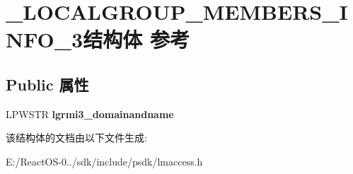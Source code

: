 \hypertarget{struct___l_o_c_a_l_g_r_o_u_p___m_e_m_b_e_r_s___i_n_f_o__3}{}\section{\+\_\+\+L\+O\+C\+A\+L\+G\+R\+O\+U\+P\+\_\+\+M\+E\+M\+B\+E\+R\+S\+\_\+\+I\+N\+F\+O\+\_\+3结构体 参考}
\label{struct___l_o_c_a_l_g_r_o_u_p___m_e_m_b_e_r_s___i_n_f_o__3}
\subsection*{Public 属性}
\begin{DoxyCompactItemize}
\item 
\mbox{\label{struct___l_o_c_a_l_g_r_o_u_p___m_e_m_b_e_r_s___i_n_f_o__3_a492b2d7af382118b246c2751ea1be32a}} 
L\+P\+W\+S\+TR {\bfseries lgrmi3\+\_\+domainandname}
\end{DoxyCompactItemize}


该结构体的文档由以下文件生成\+:\begin{DoxyCompactItemize}
\item 
E\+:/\+React\+O\+S-\/0../sdk/include/psdk/lmaccess.\+h\end{DoxyCompactItemize}
